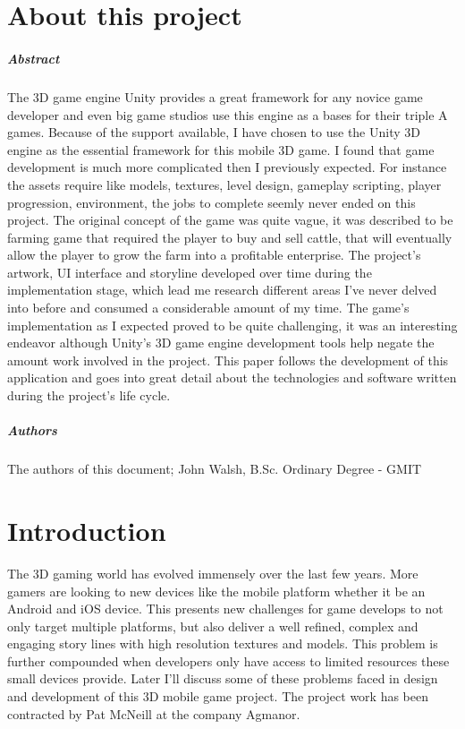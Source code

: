 
\chapter*{About this project}
\paragraph{Abstract}
The 3D game engine Unity provides a great framework for any novice game developer and even big game studios use this engine as a bases for their triple A games. Because of the support available, I have chosen to use the Unity 3D engine as the essential framework for this mobile 3D game. I found that game development is much more complicated then I previously expected. For instance the assets require like models, textures, level design, gameplay scripting, player progression, environment, the jobs to complete seemly never ended on this project. The original concept of the game was quite vague, it was described to be farming game that required the player to buy and sell cattle, that will eventually allow the player to grow the farm into a profitable enterprise. The project's artwork, UI interface and storyline developed over time during the implementation stage, which lead me research different areas I've never delved into before and consumed a considerable amount of my time. The game's implementation as I expected proved to be quite challenging, it was an interesting endeavor although Unity's 3D game engine development tools help negate the amount work involved in the project. This paper follows the development of this application and goes into great detail about the technologies and software written during the project's life cycle.

\paragraph{Authors}
The authors of this document; John Walsh, B.Sc. Ordinary Degree - GMIT

\chapter{Introduction}
The 3D gaming world has evolved immensely over the last few years. More gamers are looking to new devices like the mobile platform whether it be an Android and iOS device. This presents new challenges for game develops to not only target multiple platforms, but also deliver a well refined, complex and engaging story lines with high resolution textures and models. This problem is further compounded when developers only have access to limited resources these small devices provide. Later I'll discuss some of these problems faced in design and development of this 3D mobile game project. The project work has been contracted by Pat McNeill at the company Agmanor.
   
